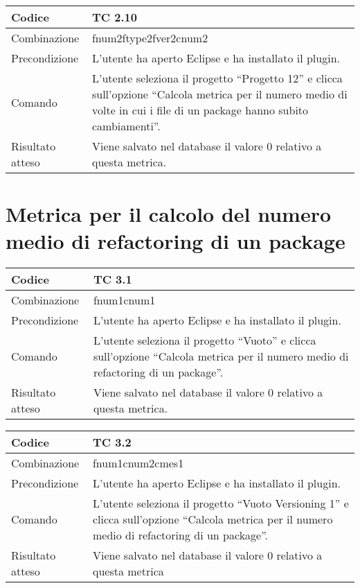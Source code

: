 \begin{table}[ht]
\begin{tabular}{|p{3cm}|p{9cm}|}
\hline
\cellcolor{lightgray}Codice				& TC 2.10								\\
\hline
\cellcolor{lightgray}Combinazione		& fnum2ftype2fver2cnum2									\\
\hline
\cellcolor{lightgray}Precondizione		& L'utente ha aperto Eclipse e ha installato il plugin.		\\
\hline
\cellcolor{lightgray}Comando			& L'utente seleziona il progetto ``Progetto 12''  e clicca sull'opzione ``Calcola metrica per il numero medio di volte in cui i file di un package hanno subito cambiamenti''.	\\
\hline
\cellcolor{lightgray}Risultato atteso	& Viene salvato nel database il valore 0 relativo a questa metrica.\\
\hline
\end{tabular}
\end{table}
\clearpage

\section{Metrica per il calcolo del numero medio di refactoring di un package}
\begin{table}[ht]
\begin{tabular}{|p{3cm}|p{9cm}|}
\hline
\cellcolor{lightgray}Codice				& TC 3.1								\\
\hline
\cellcolor{lightgray}Combinazione		& fnum1cnum1									\\
\hline
\cellcolor{lightgray}Precondizione		& L'utente ha aperto Eclipse e ha installato il plugin.		\\
\hline
\cellcolor{lightgray}Comando			& L'utente seleziona il progetto ``Vuoto''  e clicca sull'opzione ``Calcola metrica per il numero medio di refactoring di un package''.	\\
\hline
\cellcolor{lightgray}Risultato atteso	& Viene salvato nel database il valore 0 relativo a questa metrica.\\
\hline
\end{tabular}
\end{table}

\begin{table}[ht]
\begin{tabular}{|p{3cm}|p{9cm}|}
\hline
\cellcolor{lightgray}Codice				& TC 3.2								\\
\hline
\cellcolor{lightgray}Combinazione		& fnum1cnum2cmes1 									\\
\hline
\cellcolor{lightgray}Precondizione		& L'utente ha aperto Eclipse e ha installato il plugin.				\\
\hline
\cellcolor{lightgray}Comando			& L'utente seleziona il progetto ``Vuoto Versioning 1''  e clicca sull'opzione ``Calcola metrica per il numero medio di refactoring di un package''.	\\
\hline
\cellcolor{lightgray}Risultato atteso	& Viene salvato nel database il valore 0 relativo a questa metrica	\\
\hline
\end{tabular}
\end{table}

